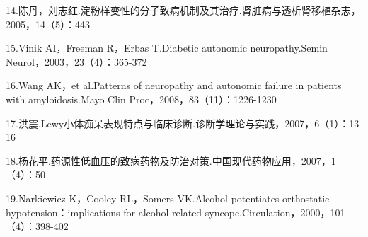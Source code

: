 14.陈丹，刘志红.淀粉样变性的分子致病机制及其治疗.肾脏病与透析肾移植杂志，2005，14（5）：443

15.Vinik AI，Freeman R，Erbas T.Diabetic autonomic neuropathy.Semin
Neurol，2003，23（4）：365-372

16.Wang AK，et al.Patterns of neuropathy and autonomic failure in
patients with amyloidosis.Mayo Clin Proc，2008，83（11）：1226-1230

17.洪震.Lewy小体痴呆表现特点与临床诊断.诊断学理论与实践，2007，6（1）：13-16

18.杨花平.药源性低血压的致病药物及防治对策.中国现代药物应用，2007，1（4）：50

19.Narkiewicz K，Cooley RL，Somers VK.Alcohol potentiates orthostatic
hypotension：implications for alcohol-related
syncope.Circulation，2000，101（4）：398-402

\protect\hypertarget{text00369.html}{}{}

